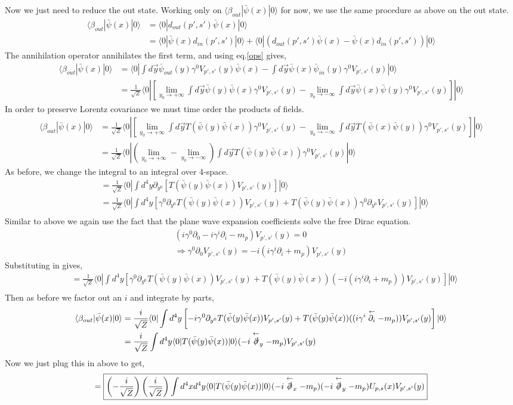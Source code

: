 \documentclass{article}
\numberwithin{equation}{section}
\newcommand{\pxb}{\bar{\psi}(x)}
\newcommand{\pyb}{\bar{\psi}(y)}
\newcommand{\pinyb}{\bar{\psi}_{in}(y)}
\newcommand{\poutyb}{\bar{\psi}_{out}(y)}
\newcommand{\beq}[1]{\begin{equation} \begin{aligned} #1 \end{aligned} \end{equation}}
\newcommand{\sqz}{\sqrt{Z}}
\newcommand{\intdfx}{\int d^4 x}
\newcommand{\intdfy}{\int d^4 y}
\newcommand{\intdty}{\int d \vec{y}}
\newcommand{\bout}{\beta_{out}}
\newcommand{\brkt}[3]{\langle #1 | #2 | #3 \rangle}
\newcommand{\din}{d_{in}(p',s')}
\newcommand{\dout}{d_{out}(p',s')}
\newcommand{\ups}{U_{p,s}(x)}
\newcommand{\vps}{V_{p',s'}(y)}
\newcommand{\dz}{\partial_{0}}
\newcommand{\di}{\partial_{i}}
\newcommand{\ldi}{\stackrel{\leftarrow}{\partial_{i}}}
\newcommand{\lds}[1]{\stackrel{\leftarrow}{\slashed{\partial}}_{#1}}
\newcommand{\dzy}{\partial_{y^0}}
\begin{document}
Now we just need to reduce the out state. Working only on $\brkt{\bout}{\pxb}{0} $ for now, we use the same procedure as above on the out state.
\beq{
    \brkt{\bout}{\pxb}{0} &= \brkt{0}{\dout \pxb}{0} \\
    &= \brkt{0}{\pxb \din}{0} + \brkt{0}{(\dout \pxb - \pxb \din)}{0}
}
The annihilation operator annihilates the first term, and using eq.\ref{ops} gives,
\beq{
    \brkt{\bout}{\pxb}{0} &= \brkt{0}{\intdty \poutyb \gamma^0 \vps \pxb - \intdty \pxb \pinyb \gamma^0 \vps}{0} \\
    &= \frac{1}{\sqz} \brkt{0}{\left[ \lim_{y_0 \to +\infty} \intdty \pyb \pxb \gamma^0 \vps - \lim_{y_0 \to -\infty} \intdty \pxb \pyb \gamma^0 \vps     \right]}{0}
}
In order to preserve Lorentz covariance we must time order the products of fields.
\beq{
    \brkt{\bout}{\pxb}{0} &=\frac{1}{\sqz}  \brkt{0}{\left[ \lim_{y_0 \to +\infty} \intdty T(\pyb \pxb)\gamma^0 \vps - \lim_{y_0 \to -\infty} \intdty T(\pxb \pyb)\gamma^0 \vps \right]}{0} \\
    &=\frac{1}{\sqz} \brkt{0}{\left( \lim_{y_0 \to +\infty} - \lim_{y_0 \to -\infty} \right) \intdty T(\pyb \pxb) \gamma^0\vps }{0}
}
As before, we change the integral to an integral over 4-space.
\beq{
    &=\frac{1}{\sqz} \brkt{0}{ \intdfy \dzy \left[T(\pyb \pxb) \vps \right] }{0} \\
    &=\frac{1}{\sqz} \brkt{0}{ \intdfy  \left[ \gamma^0 \dzy T(\pyb \pxb) \vps + T(\pyb \pxb) \gamma^0 \dzy \vps \right]  }{0} \\
} 
Similar to above we again use the fact that the plane wave expansion coefficients solve the free Dirac equation.
\beq{
    (i \gamma^0 \dz - i \gamma^i \di - m_p) \vps = 0 \\
    \Rightarrow \gamma^0 \dz \vps = -i(i \gamma^i \di + m_p)\vps
}
Substituting in gives, 
\beq{
    &=\frac{1}{\sqz} \brkt{0}{ \intdfy  \left[ \gamma^0 \dzy T(\pyb \pxb) \vps + T(\pyb \pxb) (-i(i \gamma^i \di + m_p) ) \vps \right]  }{0} \\
}
Then as before we factor out an $i$ and integrate by parts,
\beq{
   \brkt{\bout}{\pxb}{0} &=\frac{i}{\sqz} \brkt{0}{ \intdfy  \left[ -i \gamma^0 \dzy T(\pyb \pxb) \vps + T(\pyb \pxb) ((i \gamma^i \ldi - m_p) ) \vps \right]  }{0} \\
    &= \frac{i}{\sqz} \intdfy \brkt{0}{T(\pyb \pxb)}{0}(-i \lds{y} - m_p) \vps
}
Now we just plug this in above to get,
\beq{
    =\boxed{ \left(- \frac{i}{\sqz}\right) \left(\frac{i}{\sqz}\right) \intdfx d^4y \brkt{0}{T(\pyb \pxb)}{0}(-i \lds{x} - m_p) (-i \lds{y} - m_p) \ups \vps}
}
\end{document}
